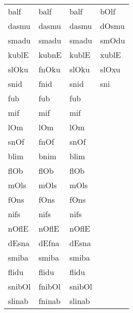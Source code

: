 \begin{appendix}
\begin{table}[!h]
\begin{tabular}{llll}
balf & balf & balf & bOlf\\
dasmu & dasmu & dasmu & dOsmu\\
smadu & smadu & smadu & smOdu\\
kublE & kubnE & kublE & xublE\\
slOku & fnOku & slOku & slOxu\\
snid & fnid & snid & sni\\
fub & fub & fub & \\
mif & mif & mif & \\
lOm & lOm & lOm & \\
snOf & fnOf & snOf & \\
blim & bnim & blim & \\
flOb & flOb & flOb & \\
mOls & mOls & mOls & \\
fOns & fOns & fOns & \\
nifs & nifs & nifs & \\
nOflE & nOflE & nOflE & \\
dEsna & dEfna & dEsna & \\
smiba & smiba & smiba & \\
flidu & flidu & flidu & \\
snibOl & fnibOl & snibOl & \\
slinab & fninab & slinab & \\
\bottomrule
\end{tabular}
\end{table}
\end{appendix}
